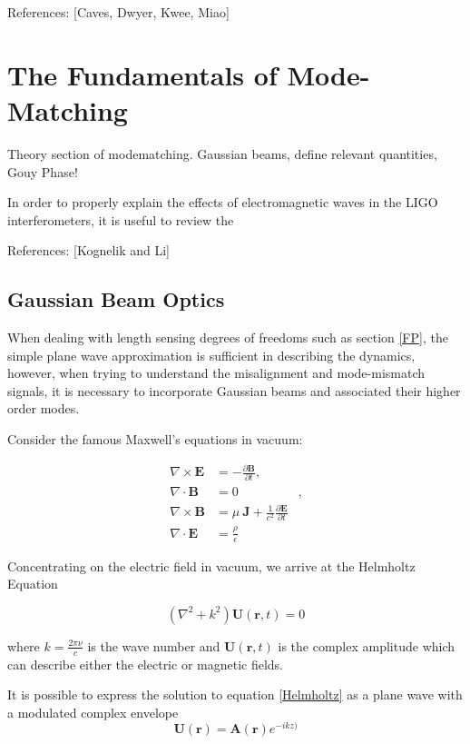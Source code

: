 \documentclass[oneside]{book}
\begin{document}
	References: [Caves, Dwyer, Kwee, Miao]
		
\chapter{The Fundamentals of Mode-Matching}
	Theory section of modematching. Gaussian beams, define relevant quantities, Gouy Phase!
	
	In order to properly explain the effects of electromagnetic waves in the LIGO interferometers, it is useful to review the  
	
	References: [Kognelik and Li]
	
		\section{Gaussian Beam Optics}
		When dealing with length sensing degrees of freedoms such as section \ref{FP}, the simple plane wave approximation is sufficient in describing the dynamics, however, when trying to understand the misalignment and mode-mismatch signals, it is necessary to incorporate Gaussian beams and associated their higher order modes.

		
		Consider the famous Maxwell's equations in vacuum:
		
		\begin{equation}
		\label{18.1:1}
		\begin{aligned}
		 \nabla \times \mathbf{E} &=-\frac{\partial \mathbf{B}} {\partial t},&
		\\\nabla \cdot \mathbf{B} &=0&,
		\\\nabla \times \mathbf{B} &= \mu\ \mathbf{J} + \frac{1}{c^2} \frac{\partial \mathbf{E}} {\partial t}&
		\\
		\nabla \cdot \mathbf{E} &= \frac{\rho}{\epsilon}&
		\end{aligned}
		\end{equation}
		
		
		Concentrating on the electric field in vacuum, we arrive at the Helmholtz Equation
		
		\begin{equation}\label{Helmholtz}
		(\nabla^2 + k^2 ) \mathbf{U}(\mathbf{r},t) = 0
		\end{equation}
	
		
		where $k=\frac{2\pi\nu}{c}$ is the wave number and $\mathbf{U}(\mathbf{r},t)$ is the complex amplitude which can describe either the electric or magnetic fields.  
		
		It is possible to express the solution to equation  \ref{Helmholtz} as
		a plane wave with a modulated complex envelope
		\begin{equation}
		\mathbf{U}(\mathbf{r}) = \mathbf{A}(\mathbf{r}) e^{-ikz)}
		\end{equation}
		
\end{document}
